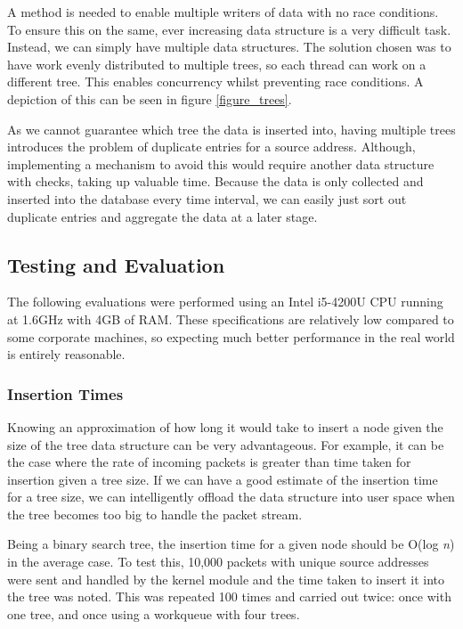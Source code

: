 \documentclass[12pt,twoside]{article}
\begin{document}
A method is needed to enable multiple writers of data with no race conditions. To ensure this on the same, ever increasing data structure is a very difficult task. Instead, we can simply have multiple data structures. The solution chosen was to have work evenly distributed to multiple trees, so each thread can work on a different tree. This enables concurrency whilst preventing race conditions. A depiction of this can be seen in figure \ref{figure_trees}.

As we cannot guarantee which tree the data is inserted into, having multiple trees introduces the problem of duplicate entries for a source address. Although, implementing a mechanism to avoid this would require another data structure with checks, taking up valuable time. Because the data is only collected and inserted into the database every time interval, we can easily just sort out duplicate entries and aggregate the data at a later stage.



\subsection{Testing and Evaluation}
The following evaluations were performed using an Intel i5-4200U CPU running at 1.6GHz with 4GB of RAM. These specifications are relatively low compared to some corporate machines, so expecting much better performance in the real world is entirely reasonable.

\subsubsection{Insertion Times}
Knowing an approximation of how long it would take to insert a node given the size of the tree data structure can be very advantageous. For example, it can be the case where the rate of incoming packets is greater than time taken for insertion given a tree size. If we can have a good estimate of the insertion time for a tree size, we can intelligently offload the data structure into user space when the tree becomes too big to handle the packet stream.

Being a binary search tree, the insertion time for a given node should be O(log \textit{n}) in the average case. To test this, 10,000 packets with unique source addresses were sent and handled by the kernel module and the time taken to insert it into the tree was noted. This was repeated 100 times and carried out twice: once with one tree, and once using a workqueue with four trees.
\end{document}
